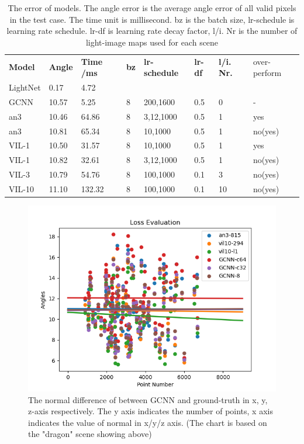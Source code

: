 \documentclass[border=15pt, multi, tikz]{article}
\newcommand{\tabhead}[1]{\textbf{#1}}
\begin{document}
\begin{table}[th]
	
	\centering
	\begin{tabular}{l l l l l l l l }
		\tabhead{Model} & \tabhead{Angle} & \tabhead{Time /ms} & \tabhead{bz} & \tabhead{lr-schedule} & \tabhead{lr-df} & \tabhead{l/i. Nr.} & over-perform\\
		LightNet  & 0.17  & 4.72 & &  & & & \\ 
		\hline
		GCNN  & 10.57 & 5.25 & 8 & 200,1600 & 0.5 & 0 & - \\
		\hline
		an3 & 10.46 & 64.86 & 8 & 3,12,1000  & 0.5 & 1 & yes\\
		\hline
		an3 & 10.81 & 65.34 & 8 & 10,1000  & 0.5 & 1 & no(yes) \\
		\hline
		VIL-1 & 10.50 & 31.57 & 8 & 10,1000 & 0.5 & 1 & yes \\
		\hline
		VIL-1 & 10.82 & 32.61 & 8 & 3,12,1000 & 0.5 & 1 & no(yes) \\
		\hline
		VIL-3  & 10.79 & 54.76 & 8 & 100,1000 & 0.1 & 3 & no(yes) \\
		\hline
		VIL-10  & 11.10 & 132.32 & 8 & 100,1000 & 0.1 &10 & no(yes)\\
	\end{tabular}
	\caption{The error of models. The angle error is the average angle error of all valid pixels in the test case. The time unit is millisecond. bz is the batch size, lr-schedule is learning rate schedule. lr-df is learning rate decay factor, l/i. Nr is the number of light-image maps used for each scene}	
	\label{tab:model-error}
\end{table}


\begin{figure}[th]
	\centering
	\includegraphics[width=\linewidth]{./Figures/regression-comparison.png}
	\caption{The normal difference of between GCNN and ground-truth in x, y, z-axis respectively. The y axis indicates the number of points, x axis indicates the value of normal in x/y/z axis. (The chart is based on the "dragon" scene showing above)}
	\label{fig:normal-histo-diff}
\end{figure}
\end{document}
